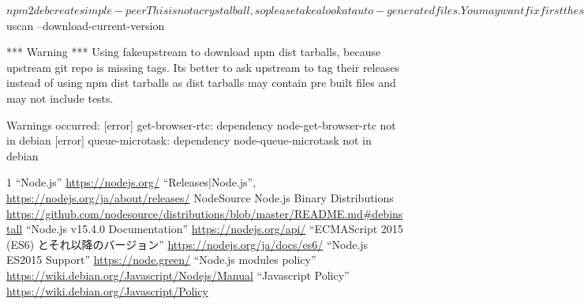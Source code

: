 \documentclass[mingoth,a4paper]{jsarticle}
\begin{document}
\begin{commandline}
$ npm2deb create simple-peer

This is not a crystal ball, so please take a look at auto-generated files.

You may want fix first these issues:

simple-peer/node-simple-peer/debian/changelog: -- FIX_ME debian author  Sat, 16 Jan 2021 10:39:59 +0900
simple-peer/node-simple-peer/debian/control:Uploaders: FIX_ME debian author
simple-peer/node-simple-peer/debian/control:Description: FIX_ME write the Debian package description
simple-peer/node-simple-peer/debian/copyright:Copyright: 2021, FIX_ME debian author
simple-peer/node-simple-peer_itp.mail:Subject: ITP: node-simple-peer -- FIX_ME write the Debian package description
simple-peer/node-simple-peer_itp.mail:Owner: FIX_ME debian author
simple-peer/node-simple-peer_itp.mail:  Description     : FIX_ME write the Debian package description
simple-peer/node-simple-peer_itp.mail: FIX_ME: This ITP report is not ready for submission, until you are
simple-peer/node-simple-peer_itp.mail:FIX_ME: Explain why this package is suitable for adding to Debian. Is
simple-peer/node-simple-peer_itp.mail:FIX_ME: Explain how you intend to consistently maintain this package

Use uscan to get orig source files. Fix debian/watch and then run                    
$ uscan --download-current-version


*** Warning ***
Using fakeupstream to download npm dist tarballs, because upstream
git repo is missing tags. Its better to ask upstream to tag their releases
instead of using npm dist tarballs as dist tarballs may contain pre built files
and may not include tests.

Warnings occurred:
 [error]   get-browser-rtc: dependency node-get-browser-rtc not in debian
 [error]   queue-microtask: dependency node-queue-microtask not in debian

\end{commandline}

\begin{thebibliography}{1}
  ``Node.js'' \url{https://nodejs.org/}
  ``Releases|Node.js'', \url{https://nodejs.org/ja/about/releases/}
  NodeSource Node.js Binary Distributions
	 \url{https://github.com/nodesource/distributions/blob/master/README.md#debinstall}
  ``Node.js v15.4.0 Documentation''  \url{https://nodejs.org/api/}
  ``ECMAScript 2015 (ES6) とそれ以降のバージョン''
	 \url{https://nodejs.org/ja/docs/es6/}
  ``Node.js ES2015 Support'' \url{https://node.green/}
	 ``Node.js modules policy'' 
	 \url{https://wiki.debian.org/Javascript/Nodejs/Manual}
	 ``Javascript Policy''
	 \url{https://wiki.debian.org/Javascript/Policy}

\end{thebibliography}
\end{document}
